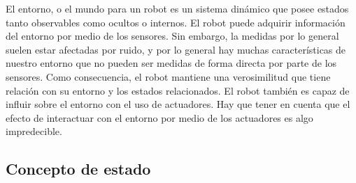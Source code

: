 El entorno, o el mundo para un robot es un sistema dinámico que posee estados tanto observables como ocultos o internos.
%
%
%
El robot puede adquirir información del entorno por medio de los sensores.
Sin embargo, la medidas por lo general suelen estar afectadas por ruido, y por lo general hay muchas características de nuestro entorno que no pueden ser medidas de forma directa por parte de los sensores. 
Como consecuencia, el robot mantiene una verosimilitud que tiene relación con su entorno y los estados relacionados.
%
%
%
El robot también es capaz de influir sobre el entorno con el uso de actuadores. Hay que tener en cuenta que el efecto de interactuar con  el entorno por medio de los actuadores es algo impredecible.
%
%
%

\subsection{Concepto de estado}

